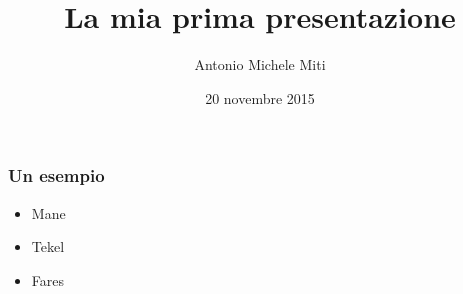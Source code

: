 \documentclass{beamer}
\title{La mia prima presentazione}
\author{Antonio Michele Miti}
\date{20 novembre 2015}
\begin{document}
	\begin{frame}
		\maketitle
	\end{frame}
	
	\begin{frame}
		\frametitle{Un esempio}
		\begin{itemize}
			\item<1-> Mane
			\item<2-> Tekel
			\item<3-> Fares
		\end{itemize}
	\end{frame}
	
\end{document}
